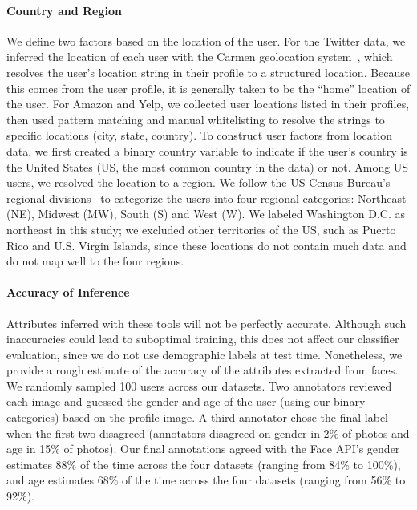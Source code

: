 \paragraph{Country and Region}

We define two factors based on the location of the user.
For the Twitter data, we inferred the location of each user with the Carmen geolocation system~\cite{dredze2013carmen},
which resolves the user's location string in their profile to a structured location. Because this comes from the user profile, it is generally taken to be the ``home'' location of the user.
For Amazon and Yelp, we collected user locations listed in their profiles,
then used pattern matching and manual whitelisting to resolve the strings to specific locations (city, state, country). 
To construct user factors from location data,
we first created a binary country variable
to indicate if the user's country is the United States (US, the most common country in the data) or not. 
Among US users, we resolved the location to a region.
We follow the US Census Bureau's regional divisions~\cite{branch_2012} to categorize the users into four regional categories: Northeast (NE), Midwest (MW), South (S) and West (W). We labeled Washington D.C. as northeast in this study;
we excluded other territories of the US, such as Puerto Rico and U.S. Virgin Islands, since these locations do not contain much data and do not map well to the four regions.

\paragraph{Accuracy of Inference}

Attributes inferred with these tools will not be perfectly accurate. 
Although such inaccuracies could lead to suboptimal training,
this does not affect our classifier evaluation,
since we do not use demographic labels at test time.
Nonetheless, we provide a rough estimate of the accuracy of the attributes extracted from faces.
We randomly sampled 100 users across our datasets.
Two annotators reviewed each image and guessed the gender and age of the user (using our binary categories) based on the profile image.
A third annotator chose the final label when the first two disagreed (annotators disagreed on gender in 2\% of photos and age in 15\% of photos).
Our final annotations agreed with the Face API's gender estimates 88\% of the time across the four datasets (ranging from 84\% to 100\%),
and age estimates 68\% of the time across the four datasets (ranging from 56\% to 92\%).


